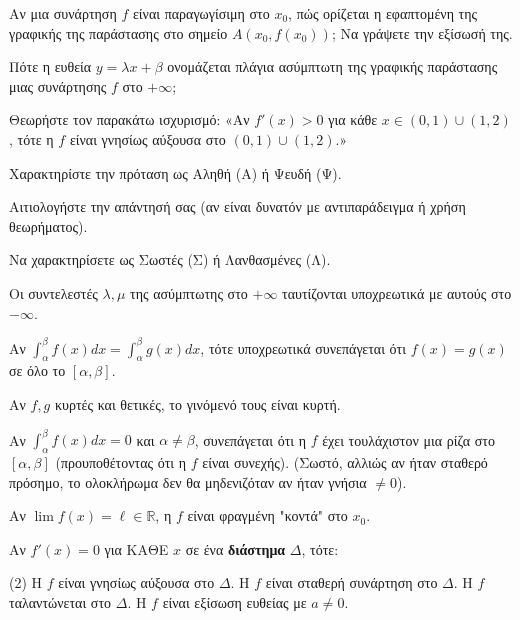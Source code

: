 \documentclass[11pt,a4paper]{article}
\newcommand{\kerkissans}[1]{{\fontfamily{maksf}\selectfont \textbf{#1}}}
\renewcommand{\textdexiakeraia}{}
\newcommand{\dint}{\displaystyle\int}
\newcommand\themanum{A}
\newcounter{thema}[section]
\renewcommand{\thethema}{\arabic{thema}}
\newcommand{\Thema}{\refstepcounter{thema}{\textbf{\textcolor{black}{\faPenSquare\ \  \large \kerkissans{\textbf{\thethemaο\hspace{2mm}Διαγώνισμα - Θέμα \themanum}}}}}\hspace{0mm}}{}
\newenvironment{thema}[1]
{\begin{tcolorbox}[title=\Thema\kerkissans{\textbf{\large{  #1}}},breakable,
enhanced standard,titlerule=0pt,toprule=0pt, rightrule=0pt, bottomrule=0pt,
colback=white,left=0mm,top=1mm,bottom=0mm,
boxrule=0pt,
colframe=white,leftrule=0mm,sharp corners,coltitle=black]
\renewcommand{\themanum}{#1}}
{\end{tcolorbox}}
\begin{document}
\begin{thema}{A}
\begin{erwthma}
    \item Αν μια συνάρτηση $f$ είναι παραγωγίσιμη στο $x_0$, πώς ορίζεται η εφαπτομένη της γραφικής της παράστασης στο σημείο $A(x_0, f(x_0))$; Να γράψετε την εξίσωσή της.
    \item Πότε η ευθεία $y=\lambda x+\beta$ ονομάζεται πλάγια ασύμπτωτη της γραφικής παράστασης μιας συνάρτησης $f$ στο $+\infty$;
    \item Θεωρήστε τον παρακάτω ισχυρισμό:
    «Αν $f'(x)>0$ για κάθε $x \in (0, 1) \cup (1, 2)$, τότε η $f$ είναι γνησίως αύξουσα στο $(0, 1) \cup (1, 2)$.»
    \begin{alist}
    \item Χαρακτηρίστε την πρόταση ως Αληθή (Α) ή Ψευδή (Ψ).
    \item Αιτιολογήστε την απάντησή σας (αν είναι δυνατόν με αντιπαράδειγμα ή χρήση θεωρήματος).
    \end{alist}
    \item Να χαρακτηρίσετε ως Σωστές (Σ) ή Λανθασμένες (Λ).
    \begin{alist}
        \item Οι συντελεστές $\lambda, \mu$ της ασύμπτωτης στο $+\infty$ ταυτίζονται υποχρεωτικά με αυτούς στο $-\infty$.
        \item Αν $\dint_\alpha^\beta f(x) dx = \dint_\alpha^\beta g(x) dx$, τότε υποχρεωτικά συνεπάγεται ότι $f(x) = g(x)$ σε όλο το $[\alpha, \beta]$.
        \item Αν $f, g$ κυρτές και θετικές, το γινόμενό τους είναι κυρτή.
        \item Αν $\dint_\alpha^\beta f(x) dx = 0$ και $\alpha \ne \beta$, συνεπάγεται ότι η $f$ έχει τουλάχιστον μια ρίζα στο $[\alpha, \beta]$ (προυποθέτοντας ότι η $f$ είναι συνεχής). (Σωστό, αλλιώς αν ήταν σταθερό πρόσημο, το ολοκλήρωμα δεν θα μηδενιζόταν αν ήταν γνήσια $\ne 0$).
        \item Αν $\lim f(x) = \ell \in \mathbb{R}$, η $f$ είναι φραγμένη "κοντά" στο $x_0$.
    \end{alist}
    \item Αν $f'(x) = 0$ για ΚΑΘΕ $x$ σε ένα \textbf{διάστημα} $\Delta$, τότε:
    \begin{tasks}[label=\let\textdexiakeraia\relax\alph*.](2)
        \task H $f$ είναι γνησίως αύξουσα στο $\Delta$.
        \task H $f$ είναι σταθερή συνάρτηση στο $\Delta$.
        \task H $f$ ταλαντώνεται στο $\Delta$.
        \task H $f$ είναι εξίσωση ευθείας με $a \ne 0$.
    \end{tasks}
\end{erwthma}
\end{thema}
\vspace{1cm}
\end{document}
